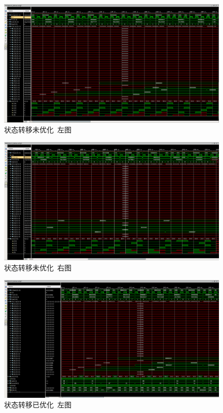 \documentclass[12pt,a4paper]{article}
\begin{document}
\begin{figure}[h]
	\centering
	\includegraphics[width=\textwidth]{seq1}
	\caption{状态转移未优化~左图}
	\label{fig:seq1-1}
\end{figure}

\begin{figure}[h]
	\centering
	\includegraphics[width=\textwidth]{seq2}
	\caption{状态转移未优化~右图}
	\label{fig:seq1-2}
\end{figure}

\begin{figure}[h]
	\centering
	\includegraphics[width=\textwidth]{seq3}
	\caption{状态转移已优化~左图}
	\label{fig:seq2-1}
\end{figure}
\end{document}
